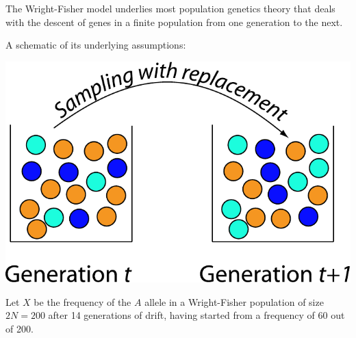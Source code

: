 The Wright-Fisher model underlies most population genetics theory that deals with the descent of genes in a finite population from one generation to the next.

A schematic of its underlying assumptions:
\begin{center}
\includegraphics[width=.52\textwidth]{illus/wfmodel.pdf}
\end{center}

Let $X$ be the frequency of the $A$ allele in a Wright-Fisher population of size $2N=200$ after 14 generations of drift, having started from a frequency of 60 out of 200.

